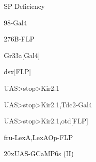 \documentclass[17pt]{extarticle}
\begin{document}
\footnotesize
\newpage\vspace*{-0.15cm}
\begin{normalsize}
SP Deficiency \\[0.5em]
\end{normalsize}
\footnotesize
\newpage\vspace*{-0.15cm}
\begin{large}
98-Gal4 \\[0.5em]
\end{large}
\footnotesize
\newpage\vspace*{-0.15cm}
\begin{large}
276B-FLP \\[0.5em]
\end{large}
\footnotesize
\newpage\vspace*{-0.15cm}
\begin{normalsize}
Gr33a[Gal4] \\[0.5em]
\end{normalsize}
\footnotesize
\newpage\vspace*{-0.15cm}
\begin{large}
dsx[FLP] \\[0.5em]
\end{large}
\footnotesize
\newpage\vspace*{-0.15cm}
\begin{normalsize}
UAS>stop>Kir2.1 \\[0.5em]
\end{normalsize}
\footnotesize
\newpage\vspace*{-0.15cm}
\begin{footnotesize}
UAS>stop>Kir2.1,Tdc2-Gal4 \\[0.5em]
\end{footnotesize}
\footnotesize
\newpage\vspace*{-0.15cm}
\begin{footnotesize}
UAS>stop>Kir2.1,otd[FLP] \\[0.5em]
\end{footnotesize}
\footnotesize
\newpage\vspace*{-0.15cm}
\begin{footnotesize}
fru-LexA,LexAOp-FLP \\[0.5em]
\end{footnotesize}
\footnotesize
\newpage\vspace*{-0.15cm}
\begin{footnotesize}
20xUAS-GCaMP6s (II) \\[0.5em]
\end{footnotesize}
\end{document}
